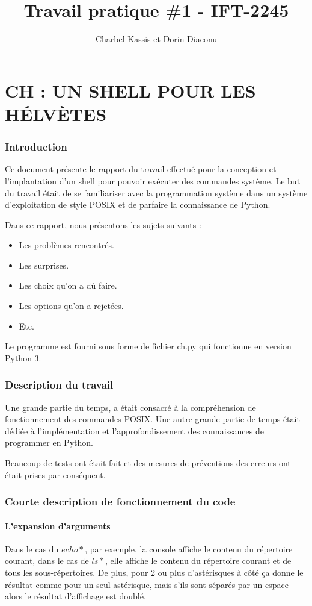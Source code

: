 \documentclass{article}
\title{Travail pratique \#1 - IFT-2245}
\author{Charbel Kassis et Dorin Diaconu}
\begin{document}
\maketitle

\newpage

\part*{CH : UN SHELL POUR LES HÉLVÈTES}

\section*{Introduction}
Ce document présente le rapport du travail effectué pour la conception et l’implantation d’un shell pour pouvoir exécuter des commandes système. Le but du travail était de se familiariser avec la programmation système dans un système d’exploitation de style POSIX et de parfaire la connaissance de Python.

Dans ce rapport, nous présentons les sujets suivants :
\begin{itemize}
\item	Les problèmes rencontrés.
\item	Les surprises.
\item	Les choix qu’on a dû faire.
\item	Les options qu’on a rejetées.
\item	Etc.
\end{itemize}

Le programme est fourni sous forme de fichier ch.py qui fonctionne en version Python 3.
\section*{Description du travail}
Une grande partie du temps, a était consacré à la compréhension de fonctionnement des commandes POSIX. Une autre grande partie de temps était dédiée à l’implémentation et l’approfondissement des connaissances de programmer en Python.

Beaucoup de tests ont était fait et des mesures de préventions des erreurs ont était prises par conséquent.
\section*{Courte description de fonctionnement du code}
\subsection*{L’expansion d’arguments}
Dans le cas du $echo *$, par exemple, la console affiche le contenu du répertoire courant, dans le cas de $ls *$, elle affiche le contenu du répertoire courant et de tous les sous-répertoires. De plus, pour 2 ou plus d’astérisques à côté ça donne le résultat comme pour un seul astérisque, mais s’ils sont séparés par un espace alors le résultat d’affichage est doublé. 
\end{document}
